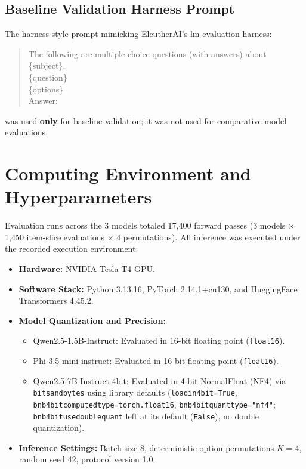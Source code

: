 \documentclass[sigconf,nonacm]{acmart}
\makeatletter
\DeclareRobustCommand{\_}{\ifmmode\nfss@text{\textunderscore}\else\textunderscore\allowbreak\fi}
\makeatother
\begin{document}
\subsection{Baseline Validation Harness Prompt}
The harness-style prompt mimicking EleutherAI's \textsf{lm-evaluation-harness}:
\begin{quote}
\small\ttfamily\raggedright
The following are multiple choice questions (with answers) about \{subject\}.\\[0.6\baselineskip]
\{question\}\\
\{options\}\\
Answer:
\end{quote}
was used \textbf{only} for baseline validation; it was not used for comparative model evaluations.

\section{Computing Environment and Hyperparameters}
Evaluation runs across the 3 models totaled 17,400 forward passes (3 models $\times$ 1,450 item-slice evaluations $\times$ 4 permutations). All inference was executed under the recorded execution environment:
\begin{itemize}
    \item \textbf{Hardware:} NVIDIA Tesla T4 GPU.
    \item \textbf{Software Stack:} Python 3.13.16, PyTorch 2.14.1+cu130, and HuggingFace Transformers 4.45.2.
    \item \textbf{Model Quantization and Precision:}
    \begin{itemize}
        \item \textsf{Qwen2.5-1.5B-Instruct}: Evaluated in 16-bit floating point (\texttt{float16}).
        \item \textsf{Phi-3.5-mini-instruct}: Evaluated in 16-bit floating point (\texttt{float16}).
        \item \textsf{Qwen2.5-7B-Instruct-4bit}: Evaluated in 4-bit NormalFloat (NF4) via \texttt{bitsandbytes} using library defaults (\texttt{load\_in\_4bit=True}, \texttt{bnb\_4bit\_compute\_dtype=torch.float16}, \texttt{bnb\_4bit\_quant\_type="nf4"}; \texttt{bnb\_4bit\_use\_double\_quant} left at its default (\texttt{False}), no double quantization).
    \end{itemize}
    \item \textbf{Inference Settings:} Batch size 8, deterministic option permutations $K = 4$, random seed 42, protocol version 1.0.
\end{itemize}
\end{document}
